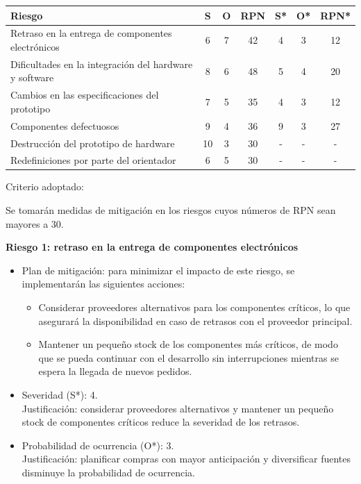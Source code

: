 \documentclass[
11pt, %
]{charter}
\begin{document}
\begin{table}[htpb]
\centering
\begin{tabularx}{\linewidth}{@{}|X|c|c|c|c|c|c|@{}}
\hline
\rowcolor[HTML]{C0C0C0} 
Riesgo & S & O & RPN & S* & O* & RPN* \\ \hline
Retraso en la entrega de componentes electrónicos & 6 & 7 & 42 & 4 & 3 & 12 \\ \hline
Dificultades en la integración del hardware y software & 8 & 6 & 48 & 5 & 4 & 20 \\ \hline
Cambios en las especificaciones del prototipo & 7 & 5 & 35 & 4 & 3 & 12 \\ \hline
Componentes defectuosos & 9 & 4 & 36 & 9 & 3 & 27 \\ \hline
Destrucción del prototipo de hardware & 10 & 3 & 30 & -& - & - \\ \hline
Redefiniciones por parte del orientador & 6 & 5 & 30 & - & -& - \\ \hline
\end{tabularx}%
\end{table}

Criterio adoptado:

Se tomarán medidas de mitigación en los riesgos cuyos números de RPN sean mayores a 30.


\textbf{Riesgo 1: retraso en la entrega de componentes electrónicos}
\begin{itemize}
	\item Plan de mitigación: para minimizar el impacto de este riesgo, se implementarán las siguientes acciones:
	\begin{itemize}
	    \item Considerar proveedores alternativos para los componentes críticos, lo que asegurará la disponibilidad en caso de retrasos con el proveedor principal.
    	\item Mantener un pequeño stock de los componentes más críticos, de modo que se pueda continuar con el desarrollo sin interrupciones mientras se espera la llegada de nuevos pedidos.
	\end{itemize}

    \item Severidad (S*): 4.\\
    Justificación: considerar proveedores alternativos y mantener un pequeño stock de componentes críticos reduce la severidad de los retrasos.
    \item Probabilidad de ocurrencia (O*): 3.\\
    Justificación: planificar compras con mayor anticipación y diversificar fuentes disminuye la probabilidad de ocurrencia.
\end{itemize}
\end{document}
